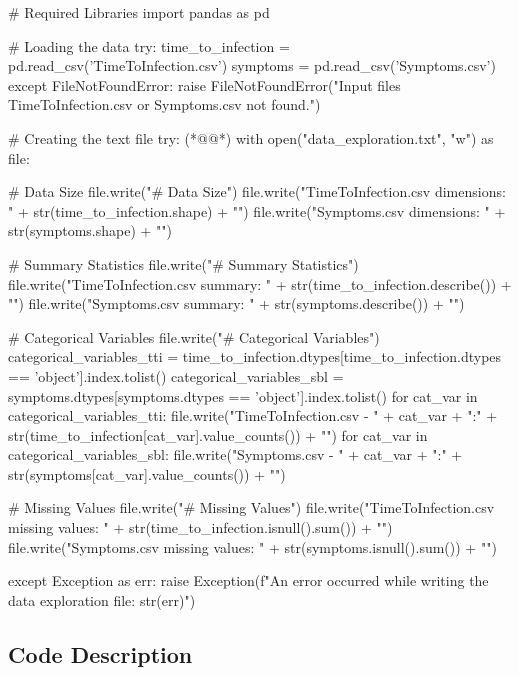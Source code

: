 \documentclass[11pt]{article}
\begin{document}
\begin{python}

# Required Libraries
import pandas as pd

# Loading the data
try:
    time_to_infection = pd.read_csv('TimeToInfection.csv')
    symptoms = pd.read_csv('Symptoms.csv')
except FileNotFoundError:
    raise FileNotFoundError("Input files TimeToInfection.csv or Symptoms.csv not found.")

# Creating the text file
try:
(*@@*)    with open("data_exploration.txt", "w") as file:
    
        # Data Size
        file.write("# Data Size\n")
        file.write("TimeToInfection.csv dimensions: " + str(time_to_infection.shape) + "\n")
        file.write("Symptoms.csv dimensions: " + str(symptoms.shape) + "\n")
    
        # Summary Statistics
        file.write("\n# Summary Statistics\n")
        file.write("TimeToInfection.csv summary: \n" + str(time_to_infection.describe()) + "\n")
        file.write("Symptoms.csv summary: \n" + str(symptoms.describe()) + "\n")
    
        # Categorical Variables
        file.write("\n# Categorical Variables\n")
        categorical_variables_tti = time_to_infection.dtypes[time_to_infection.dtypes == 'object'].index.tolist()
        categorical_variables_sbl = symptoms.dtypes[symptoms.dtypes == 'object'].index.tolist()
        for cat_var in categorical_variables_tti:
            file.write("TimeToInfection.csv - " + cat_var + ":\n" 
                        + str(time_to_infection[cat_var].value_counts()) + "\n")
        for cat_var in categorical_variables_sbl:
            file.write("Symptoms.csv - " + cat_var + ":\n" 
                        + str(symptoms[cat_var].value_counts()) + "\n")
    
        # Missing Values
        file.write("\n# Missing Values\n")
        file.write("TimeToInfection.csv missing values: \n" + str(time_to_infection.isnull().sum()) + "\n")
        file.write("Symptoms.csv missing values: \n" + str(symptoms.isnull().sum()) + "\n")
        
except Exception as err:
    raise Exception(f"An error occurred while writing the data exploration file: {str(err)}")

\end{python}

\subsection{Code Description}
\end{document}
